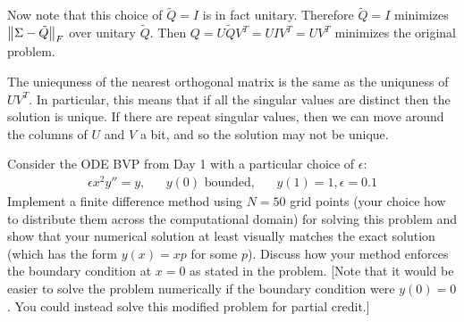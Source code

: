 \documentclass[10pt]{article}
\begin{document}
\begin{solution}[Solution]
    Now note that this choice of \( \tilde{Q} = I \) is in fact unitary. Therefore \( \tilde{Q} = I \) minimizes \( \left\lVert\Sigma-\tilde{Q}\right\rVert_F \) over unitary \( \tilde{Q} \). Then \( Q = U\tilde{Q}V^T = UIV^T = UV^T \) minimizes the original problem.

The uniequness of the nearest orthogonal matrix is the same as the uniquness of \( UV^T \). In particular, this means that if all the singular values are distinct then the solution is unique. If there are repeat singular values, then we can move around the columns of \( U \) and \( V \) a bit, and so the solution may not be unique.

\end{solution}



\begin{problem}
Consider the ODE BVP from Day 1 with a particular choice of \( \epsilon \):
\begin{align*}
    \epsilon x^2 y'' = y, && y(0)\text{ bounded}, &&y(1)=1,\epsilon=0.1
\end{align*}
    Implement a finite difference method using \( N = 50 \) grid points (your choice how to distribute them across the computational domain) for solving this problem and show that your numerical solution at least visually matches the exact solution (which has the form \( y(x) = xp \) for some \( p \)). Discuss how your method enforces the boundary condition at \( x = 0 \) as stated in the problem. [Note that it would be easier to solve the problem numerically if the boundary condition were \( y(0) = 0 \). You could instead solve this modified problem for partial credit.]
\end{problem}

\begin{solution}[Solution]

\end{solution}
\end{document}

